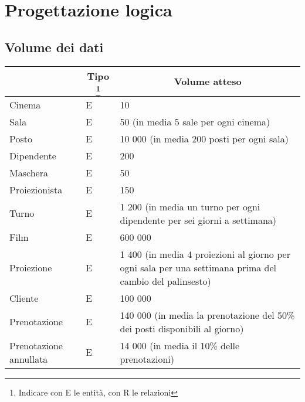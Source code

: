 \section{Progettazione logica}

\subsection*{Volume dei dati}
%
%
\begin{tabularx}{\linewidth}{|X|l|X|}
    \hline
    \rowcolor{tblhdrcolor}
    \multicolumn{1}{|c|}{\textbf{Concetto nello schema}}
     & \multicolumn{1}{|c|}{\textbf{Tipo}
        \footnote{Indicare con E le entità, con R le relazioni}}
     & \multicolumn{1}{|c|}{\textbf{Volume atteso}}
    \\\hline
    Cinema
     & E
     & 10
    \\\hline
    Sala
     & E
     & 50 (in media 5 sale per ogni cinema)
    \\ \hline
    Posto
     & E
     & 10 000 (in media 200 posti per ogni sala)
    \\ \hline
    Dipendente
     & E
     & 200
    \\ \hline
    Maschera
     & E
     & 50
    \\ \hline
    Proiezionista
     & E
     & 150
    \\ \hline
    Turno
     & E
     & 1 200 (in media un turno per ogni dipendente per sei giorni a settimana)
    \\ \hline
    Film
     & E
     & 600 000
    \\ \hline
    Proiezione
     & E
     & 1 400 (in media 4 proiezioni al giorno per ogni sala per una settimana
    prima del cambio del palinsesto)
    \\ \hline
    Cliente
     & E
     & 100 000
    \\ \hline
    Prenotazione
     & E
     & 140 000 (in media la prenotazione del 50\% dei posti disponibili al
    giorno)
    \\ \hline
    Prenotazione annullata
     & E
     & 14 000 (in media il 10\% delle prenotazioni)
    \\ \hline

\end{tabularx}

